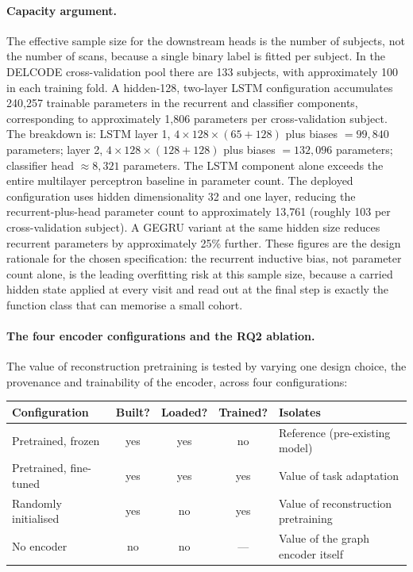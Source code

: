 \paragraph{Capacity argument.}
The effective sample size for the downstream heads is the number of subjects, not the
number of scans, because a single binary label is fitted per subject. In the \ac{DELCODE}
cross-validation pool there are 133 subjects, with approximately 100 in each training
fold. A hidden-128, two-layer \ac{LSTM} configuration accumulates 240,257 trainable
parameters in the recurrent and classifier components, corresponding to approximately 1,806
parameters per cross-validation subject. The breakdown is: \ac{LSTM} layer 1,
$4 \times 128 \times (65 + 128)$ plus biases $= 99{,}840$ parameters; layer 2,
$4 \times 128 \times (128 + 128)$ plus biases $= 132{,}096$ parameters; classifier head
$\approx 8{,}321$ parameters. The \ac{LSTM} component alone exceeds the entire multilayer
perceptron baseline in parameter count. The deployed configuration uses hidden
dimensionality 32 and one layer, reducing the recurrent-plus-head parameter count to
approximately 13,761 (roughly 103 per cross-validation subject). A \ac{GEGRU} variant at
the same hidden size reduces recurrent parameters by approximately 25\% further. These
figures are the design
rationale for the chosen specification: the recurrent inductive bias, not parameter count
alone, is the leading overfitting risk at this sample size, because a carried hidden state
applied at every visit and read out at the final step is exactly the function class that
can memorise a small cohort.

\paragraph{The four encoder configurations and the RQ2 ablation.}
The value of reconstruction pretraining is tested by varying one design choice, the
provenance and trainability of the encoder, across four configurations:

\begin{center}
\small
\begin{tabularx}{\textwidth}{@{}lcccX@{}}
\toprule
Configuration & Built? & Loaded? & Trained? & Isolates \\
\midrule
Pretrained, frozen & yes & yes & no & Reference (pre-existing model) \\
Pretrained, fine-tuned & yes & yes & yes & Value of task adaptation \\
Randomly initialised & yes & no & yes & Value of reconstruction pretraining \\
No encoder & no & no & --- & Value of the graph encoder itself \\
\bottomrule
\end{tabularx}
\end{center}

